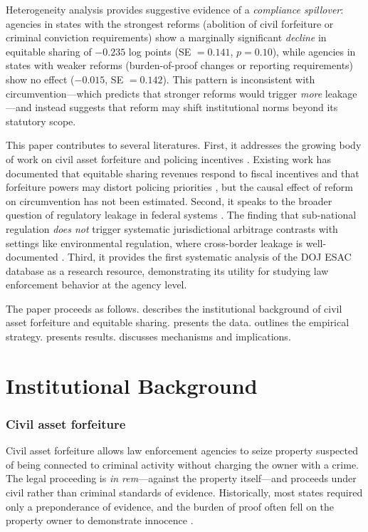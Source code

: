 \documentclass[12pt]{article}
\begin{document}
Heterogeneity analysis provides suggestive evidence of a \emph{compliance spillover}: agencies in states with the strongest reforms (abolition of civil forfeiture or criminal conviction requirements) show a marginally significant \emph{decline} in equitable sharing of $-0.235$ log points (SE $= 0.141$, $p = 0.10$), while agencies in states with weaker reforms (burden-of-proof changes or reporting requirements) show no effect ($-0.015$, SE $= 0.142$). This pattern is inconsistent with circumvention---which predicts that stronger reforms would trigger \emph{more} leakage---and instead suggests that reform may shift institutional norms beyond its statutory scope.

This paper contributes to several literatures. First, it addresses the growing body of work on civil asset forfeiture and policing incentives \citep{Baicker2004, Worrall2004, Holcomb2018, Kelly2022}. Existing work has documented that equitable sharing revenues respond to fiscal incentives \citep{Baicker2004} and that forfeiture powers may distort policing priorities \citep{Worrall2004}, but the causal effect of reform on circumvention has not been estimated. Second, it speaks to the broader question of regulatory leakage in federal systems \citep{Sigman2014, Auffhammer2011}. The finding that sub-national regulation \emph{does not} trigger systematic jurisdictional arbitrage contrasts with settings like environmental regulation, where cross-border leakage is well-documented \citep{FowlieLevinson2014}. Third, it provides the first systematic analysis of the DOJ ESAC database as a research resource, demonstrating its utility for studying law enforcement behavior at the agency level.

The paper proceeds as follows.  describes the institutional background of civil asset forfeiture and equitable sharing.  presents the data.  outlines the empirical strategy.  presents results.  discusses mechanisms and implications.

\section{Institutional Background}\label{sec:background}

\subsubsection*{Civil asset forfeiture} Civil asset forfeiture allows law enforcement agencies to seize property suspected of being connected to criminal activity without charging the owner with a crime. The legal proceeding is \emph{in rem}---against the property itself---and proceeds under civil rather than criminal standards of evidence. Historically, most states required only a preponderance of evidence, and the burden of proof often fell on the property owner to demonstrate innocence \citep{Worrall2004}.
\end{document}
